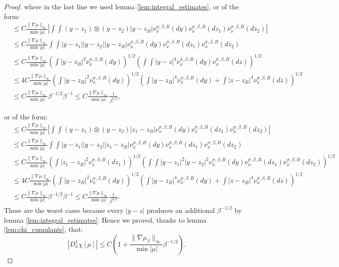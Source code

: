 \documentclass{article}
\numberwithin{theorem}{section}
\begin{document}
\begin{proof}
where in the last line we used lemma \ref{lem:integral_estimates}, or of the form:
\begin{align*}
&\leq C\frac{\|\nabla \mu\|_\infty}{\min |\mu|}\left|\int\int (y-z_1)\otimes(y-z_2) |y-z_B| \nu_x^{\sigma, \beta, B}(dy)  \nu_x^{\sigma, \beta, B}(dz_1) \nu_x^{\sigma, \beta, B}(dz_2)\right|\\
&\leq C\frac{\|\nabla \mu\|_\infty}{\min |\mu|}\int\int |y-z_1||y-z_2| |y-z_B| \nu_x^{\sigma, \beta, B}(dy)  \nu_x^{\sigma, \beta, B}(dz_1) \nu_x^{\sigma, \beta, B}(dz_2)\\
&\leq C\frac{\|\nabla \mu\|_\infty}{\min |\mu|} \left(\int |y-z_B|^2 \nu_x^{\sigma, \beta, B}(dy)\right)^{1/2} \left(\int\int|y-z|^4\nu_x^{\sigma, \beta, B}(dy)\nu_x^{\sigma, \beta, B}(dz) \right)^{1/2} \\
&\leq 4C\frac{\|\nabla \mu\|_\infty}{\min |\mu|} \left(\int|y-z_B|^2\nu_x^{\sigma, \beta, B}(dy)\right)^{1/2} \left( \int |y-z_B|^4 \nu_x^{\sigma, \beta, B}(dy)+\int |z-z_B|^4 \nu_x^{\sigma, \beta, B}(dz)\right)^{1/2}\\
&\leq C\frac{\|\nabla \mu\|_\infty}{\min |\mu|} \beta^{-1/2}\beta^{-1}\leq C\frac{\|\nabla \mu\|_\infty}{\min |\mu|}\frac{1}{\beta^{3/2}},
\end{align*}

or of the form:
\begin{align*}
&\leq C\frac{\|\nabla \mu\|_\infty}{\min |\mu|}\left|\int\int (y-z_1)\otimes(y-z_2) |z_1-z_B| \nu_x^{\sigma, \beta, B}(dy)  \nu_x^{\sigma, \beta, B}(dz_1) \nu_x^{\sigma, \beta, B}(dz_2)\right|\\
&\leq C\frac{\|\nabla \mu\|_\infty}{\min |\mu|}\int\int |y-z_1||y-z_2| |z_1-z_B| \nu_x^{\sigma, \beta, B}(dy)  \nu_x^{\sigma, \beta, B}(dz_1) \nu_x^{\sigma, \beta, B}(dz_2)\\
&\leq C\frac{\|\nabla \mu\|_\infty}{\min |\mu|} \left(\int |z_1-z_B|^2 \nu_x^{\sigma, \beta, B}(dz_1)\right)^{1/2} \left(\int\int|y-z_1|^2|y-z_2|^2\nu_x^{\sigma, \beta, B}(dy)\nu_x^{\sigma, \beta, B}(dz_1)\nu_x^{\sigma, \beta, B}(dz_2) \right)^{1/2}  \\
&\leq 4C\frac{\|\nabla \mu\|_\infty}{\min |\mu|} \left(\int|y-z_B|^2\nu_x^{\sigma, \beta, B}(dy)\right)^{1/2} \left( \int |y-z_B|^4 \nu_x^{\sigma, \beta, B}(dy)+\int |z-z_B|^4 \nu_x^{\sigma, \beta, B}(dz)\right)^{1/2}\\
&\leq C\frac{\|\nabla \mu\|_\infty}{\min |\mu|} \beta^{-1/2}\beta^{-1}\leq C\frac{\|\nabla \mu\|_\infty}{\min |\mu|}\frac{1}{\beta^{3/2}}.
\end{align*}
These are the worst cases because every $|y-z|$ produces an additional $\beta^{-1/2}$ by lemma \ref{lem:integral_estimates}.
Hence we proved, thanks to lemma \ref{lem:chi_cumulants}, that:
$$
|D^1_x\chi[\mu]| \leq C\left(1+\frac{\|\nabla \mu_\beta\|_\infty}{\min |\mu|}\beta^{-1/2}\right).
$$


\end{proof}
\end{document}
